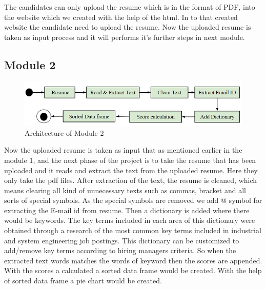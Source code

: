 \documentclass[12 pt, oneside]{book}
\begin{document}
The candidates can only upload the resume which 
is in the format of PDF, into the website which we created with the help of the html. 
In to that created website the candidate need to upload the resume. Now the uploaded resume is taken as input process and it will performs it's further steps in next module.

\bigskip


\subsection{Module 2}

\begin{figure}[h]
	\begin{center}
		\includegraphics[width = 13 cm]{m2.png}
		\caption{Architecture of Module 2}
		\label{ab}
	\end{center}
\end{figure}


\bigskip
Now the uploaded resume is taken as input that as mentioned earlier in the module 1, and the next phase of the project is to take the resume that has been uploaded and it reads and extract the text from the uploaded resume. Here they only take the pdf files. After extraction of the text, the resume is cleaned, which means clearing all kind of unnecessary texts such as commas, bracket and all sorts of special symbols. As the special symbols are removed we add @ symbol for extracting the E-mail id from resume. 
\newline Then a dictionary is added where there would be keywords. The key terms included in each area of this dictionary were obtained through a research of the most common key terms included in industrial and system engineering job postings. This dictionary can be customized to add/remove key terms according to hiring managers criteria.
\newline
So when the extracted text words matches the words of keyword then the scores are appended. With the scores a calculated a sorted data frame would be created. With the help of sorted data frame a pie chart would be created. 
\end{document}
